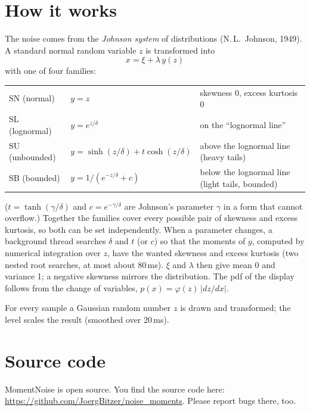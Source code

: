 \documentclass[12pt]{article}
\newcommand{\sourceurl}{https://github.com/JoergBitzer/noise_moments}
\begin{document}
\begin{center}
\small

\end{center}

\section{How it works}
\label{sec:how}
The noise comes from the \emph{Johnson system} of distributions (N.\,L.~Johnson, 1949). A standard
normal random variable $z$ is transformed into
\[ x = \xi + \lambda \, y(z) \]
with one of four families:
\begin{center}
\begin{tabular}{lll}
SN (normal) & $y = z$ & skewness 0, excess kurtosis 0\\
SL (lognormal) & $y = e^{z/\delta}$ & on the ``lognormal line''\\
SU (unbounded) & $y = \sinh(z/\delta) + t\cosh(z/\delta)$ & above the lognormal line (heavy tails)\\
SB (bounded) & $y = 1/(e^{-z/\delta} + c)$ & below the lognormal line (light tails, bounded)\\
\end{tabular}
\end{center}
($t = \tanh(\gamma/\delta)$ and $c = e^{-\gamma/\delta}$ are Johnson's parameter $\gamma$ in a form that
cannot overflow.) Together the families cover every possible pair of skewness and excess kurtosis, so
both can be set independently. When a parameter changes, a background thread searches $\delta$ and
$t$ (or $c$) so that the moments of $y$, computed by numerical integration over $z$, have the wanted
skewness and excess kurtosis (two nested root searches, at most about 80\,ms). $\xi$ and $\lambda$ then
give mean 0 and variance 1; a negative skewness mirrors the distribution. The pdf of the display
follows from the change of variables, $p(x) = \varphi(z)\,|dz/dx|$.

For every sample a Gaussian random number $z$ is drawn and transformed; the level scales the result
(smoothed over 20\,ms).

\section{Source code}
MomentNoise is open source. You find the source code here:\newline
\url{\sourceurl}. Please report bugs there, too.
\end{document}
